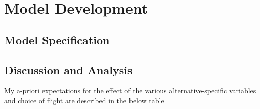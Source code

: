 \section{Model Development}
\subsection{Model Specification}
\subsection{Discussion and Analysis}
My a-priori expectations for the effect of the various alternative-specific variables and choice of flight are described in the below table
